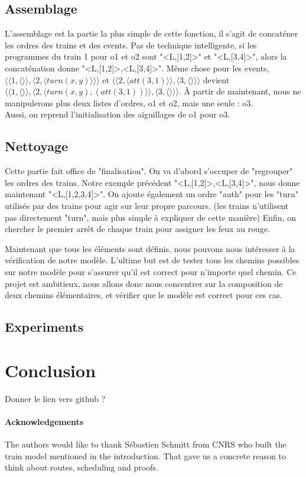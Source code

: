 \documentclass[runningheads]{llncs}
\newcommand{\tuple}[1]{\ensuremath{\langle #1\rangle}}
\begin{document}
\subsection{Assemblage}
L'assemblage est la partie la plus simple de cette fonction, il s'agit de concaténer les ordres des trains et des events.
Pas de technique intelligente, si les programmes du train 1 pour o1 et o2 sont "<L,[1,2]>" et "<L,[3,4]>", alors la concaténation donne "<L,[1,2]>,<L,[3,4]>".
Même chose pour les events, \tuple{\tuple{1,\tuple{}},\tuple{2,\tuple{turn(x,y)}}} et \tuple{\tuple{2,\tuple{att(3,1)}},\tuple{3,\tuple{}}} devient \tuple{\tuple{1,\tuple{}},\tuple{2,\tuple{turn(x,y),(att(3,1))}},\tuple{3,\tuple{}}}.
À partir de maintenant, nous ne manipulerons plus deux listes d'ordres, o1 et o2, mais une seule : o3. 
\\Aussi, on reprend l'initialisation des aiguillages de o1 pour o3.

\subsection{Nettoyage}
Cette partie fait office de "finalisation". On va d'abord s'occuper de "regrouper" les ordres des trains. Notre exemple précédent "<L,[1,2]>,<L,[3,4]>", nous donne maintenant "<L,[1,2,3,4]>". 
On ajoute également un ordre "auth" pour les "turn" utilisés par des trains pour agir sur leur propre parcours. (les trains n'utilisent pas directement "turn", mais plus simple à expliquer de cette manière)
Enfin, on chercher le premier arrêt de chaque train pour assigner les feux au rouge.

Maintenant que tous les éléments sont définis, nous pouvons nous intéresser à la vérification de notre modèle.
L'ultime but est de tester tous les chemins possibles sur notre modèle pour s'assurer qu'il est correct pour n'importe quel chemin.
Ce projet est ambitieux, nous allons donc nous concentrer sur la composition de deux chemins élémentaires, et vérifier que le modèle est correct pour ces cas.


\subsection{Experiments}
\label{sec:experiments:4}


\section{Conclusion}
\label{sec:conclusion}

Donner le lien vers github ? 


\paragraph{Acknowledgements} The authors would like to thank Sébastien Schmitt from CNRS who built the train model mentioned in the introduction. That gave us a concrete reason to think about routes, scheduling and proofs. 



\end{document}
